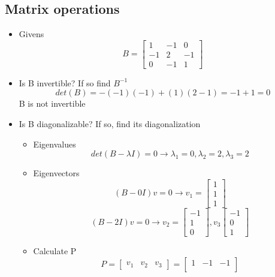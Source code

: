 \documentclass{article}
\begin{document}
\subsection{Matrix operations}
\begin{itemize}
    \item Givens
    \[
        B = \begin{bmatrix}
            1  & -1 & 0  \\ 
            -1 & 2  & -1 \\ 
            0  & -1 & 1   
        \end{bmatrix}
    \]
    \item Is B invertible? If so find $B^{-1}$
    \[
        det(B) = -(-1) (-1) + (1) (2-1) = -1 + 1 = 0
    \]
    B is not invertible

    \item Is B diagonalizable? If so, find its diagonalization
        \begin{itemize}
            \item Eigenvalues
            \[
                det(B - \lambda I) = 0 \longrightarrow
                \lambda_1 = 0, \lambda_2 = 2, \lambda_3 = 2
            \]
            \item Eigenvectors
            \[
                (B - 0I)v = 0 \longrightarrow v_1 = \begin{bmatrix}
                    1 \\ 1 \\ 1
                \end{bmatrix}
            \]
            \[
                (B - 2I)v = 0 \longrightarrow 
                v_2 = 
                \begin{bmatrix}
                    -1 \\ 1 \\ 0
                \end{bmatrix}, 
                v_3
                \begin{bmatrix}
                    -1 \\ 0 \\ 1
                \end{bmatrix}
            \]
            \item Calculate P
            \[ P =
                \begin{bmatrix}
                    v_1 & v_2 & v_3
                \end{bmatrix} =
                \begin{bmatrix}
                    1 & -1 & -1 \\

\end{bmatrix}\]
\end{itemize}
\end{itemize}
\end{document}
